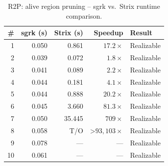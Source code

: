 \begin{table}[htbp]
\centering
\caption{R2P: alive region pruning -- sgrk vs.\ Strix runtime comparison.}
\label{tab:R2P_alive_region_pruning}
\begin{tabular}{r r r r l}
\toprule
\# & sgrk (s) & Strix (s) & Speedup & Result \\
\midrule
1 & 0.050 & 0.861 & $17.2\times$ & Realizable \\
2 & 0.039 & 0.072 & $1.8\times$ & Realizable \\
3 & 0.041 & 0.089 & $2.2\times$ & Realizable \\
4 & 0.044 & 0.181 & $4.1\times$ & Realizable \\
5 & 0.044 & 0.888 & $20.2\times$ & Realizable \\
6 & 0.045 & 3.660 & $81.3\times$ & Realizable \\
7 & 0.050 & 35.445 & $709\times$ & Realizable \\
8 & 0.058 & T/O & >$93,103\times$ & Realizable \\
9 & 0.078 & --- & --- & Realizable \\
10 & 0.061 & --- & --- & Realizable \\
\bottomrule
\end{tabular}
\end{table}
